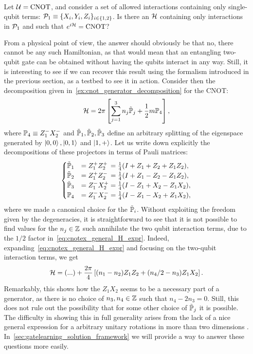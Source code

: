 \begin{example}[label={ex:cnot_physical_constraints}]
Let $\mathcal{U}=\operatorname{CNOT}$, and consider a set of allowed interactions containing only single-qubit terms: $\mathcal{P}_1\equiv\{X_i,Y_i,Z_i\}_{i\in\{1,2\}}$.
Is there an $\mathcal{H}$ containing only interactions in $\mathcal{P}_1$ and such that $e^{i\mathcal{H}}=\operatorname{CNOT}$?

From a physical point of view, the answer should obviously be that no, there cannot be any such Hamiltonian, as that would mean that an entangling two-qubit gate can be obtained without having the qubits interact in any way.
Still, it is interesting to see if we can recover this result using the formalism introduced in the previous section, as a testbed to see it in action.
Consider then the decomposition given in~\cref{ex:cnot_generator_decomposition} for the CNOT:
\begin{equation}
    \mathcal{H} =
    2\pi\left[
    \sum_{j=1}^3 n_j \tilde{\mathbb{P}}_j +
    \frac{1}{2} m\mathbb{P}_4
    \right],
\label{eq:cnotex_general_H_expr}
\end{equation}
where
$\mathbb{P}_4\equiv Z_1^- X_2^-$ and $\tilde{\mathbb{P}}_1,\tilde{\mathbb{P}}_2,\tilde{\mathbb{P}}_3$ define an arbitrary splitting of the eigenspace generated by $\ket{0,0},\ket{0,1}$ and $\ket{1,+}$.
Let us write down explicitly the decompositions of these projectors in terms of Pauli matrices:
\begin{equation}
\begin{cases}
    \tilde{\mathbb{P}}_1 &= Z_1^+ Z_2^+ \,= \frac{1}{4} (I + Z_1 + Z_2 + Z_1 Z_2), \\
    \tilde{\mathbb{P}}_2 &= Z_1^+ Z_2^- \,= \frac{1}{4} (I + Z_1 - Z_2 - Z_1 Z_2), \\
    \tilde{\mathbb{P}}_3 &= Z_1^- X_2^+ = \frac{1}{4} (I - Z_1 + X_2 - Z_1 X_2), \\
    \mathbb{P}_4 &= Z_1^- X_2^- = \frac{1}{4} (I - Z_1 - X_2 + Z_1 X_2),
\end{cases}
\end{equation}
where we made a canonical choice for the $\tilde{\mathbb{P}}_i$.
Without exploiting the freedom given by the degeneracies, it is straightforward to see that it is not possible to find values for the $n_j\in\mathbb{Z}$ such annihilate the two qubit interaction terms, due to the $1/2$ factor in~\cref{eq:cnotex_general_H_expr}.
Indeed, expanding~\cref{eq:cnotex_general_H_expr} and focusing on the two-qubit interaction terms, we get
\begin{equation}
    \mathcal{H} = (...) + \frac{2\pi}{4}\left[
    (n_1 - n_2) Z_1 Z_2 +
    (n_4/2 - n_3) Z_1 X_2
    \right].
\end{equation}
Remarkably, this shows how the $Z_1 X_2$ seems to be a necessary part of a generator, as there is no choice of $n_3,n_4\in\mathbb{Z}$ such that $n_4-2 n_3=0$.
Still, this does not rule out the possibility that for some other choice of $\tilde{\mathbb{P}}_j$ it is possible.
The difficulty in showing this in full generality arises from the lack of a nice general expression for a arbitrary unitary rotations in more than two dimensions .
In~\cref{sec:gatelearning_solution_framework} we will provide a way to answer these questions more easily.
\end{example}

